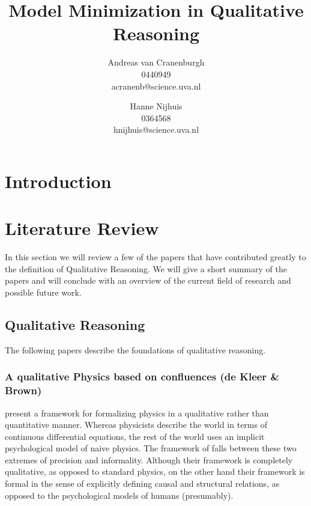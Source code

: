 \documentclass{article}
\title{Model Minimization in Qualitative Reasoning}
\author{Andreas van Cranenburgh \\ 0440949 \\ acranenb@science.uva.nl 
\and Hanne Nijhuis \\ 0364568 \\ hnijhuis@science.uva.nl}
\begin{document}
\maketitle


\newpage

\tableofcontents
\newpage

\section{Introduction}

\section{Literature Review}
In this section we will review a few of the papers that have contributed
greatly to the definition of Qualitative Reasoning. We will give a short
summary of the papers and will conclude with an overview of the current field
of research and possible future work.

\subsection{Qualitative Reasoning}
The following papers describe the foundations of qualitative reasoning.

\subsubsection{A qualitative Physics based on confluences (de Kleer \& Brown)}

\cite{kleer} present a framework for formalizing physics in a qualitative
rather than quantitative manner. Whereas physicists describe the world in terms
of continuous differential equations, the rest of the world uses an implicit
psychological model of naive physics. The framework of \cite{kleer} falls between
these two extremes of precision and informality. Although their framework is completely
qualitative, as opposed to standard physics, on the other hand their framework
is formal in the sense of explicitly defining causal and structural relations, as opposed
to the psychological models of humans (presumably).
\end{document}
